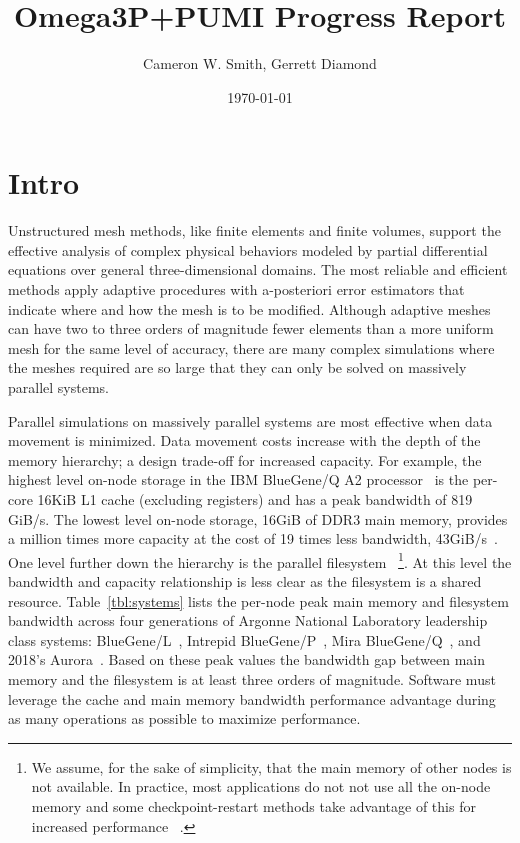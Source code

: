 \documentclass[a4paper]{article}
\title{Omega3P+PUMI Progress Report}
\author{Cameron W. Smith, Gerrett Diamond}
\date{\today}
\begin{document}
\maketitle
\section{Intro}

Unstructured mesh methods, like finite elements and finite volumes, support the 
effective analysis of complex physical behaviors modeled by partial differential
equations over general three-dimensional domains.
The most reliable and efficient methods apply adaptive procedures with
a-posteriori error estimators that indicate where and how the mesh is to be
modified.
Although adaptive meshes can have two to three orders of magnitude fewer
elements than a more uniform mesh for the same level of accuracy, there are many
complex simulations where the meshes required are so large that they can only be
solved on massively parallel systems.

Parallel simulations on massively parallel systems are most effective when data
movement is minimized.
Data movement costs increase with the depth of the memory hierarchy; a design
trade-off for increased capacity.
For example, the highest level on-node storage in the IBM BlueGene/Q A2
processor~\cite{haring2012ibm} is the per-core 16KiB L1 cache (excluding
registers) and has a peak bandwidth of 819 GiB/s.
The lowest level on-node storage, 16GiB of DDR3 main memory, provides a million
times more capacity at the cost of 19 times less bandwidth,
43GiB/s~\cite{lo2014roofline}.
One level further down the hierarchy is the parallel filesystem
~\footnote{We assume, for the sake of simplicity, that the main memory of other nodes is not
available.
In practice, most applications do not not use all the on-node memory and some
checkpoint-restart methods take advantage of this for increased performance
~\cite{rma-fault-tolerance-2014,isaila2014making,compression-cr-2012}.
}.
At this level the bandwidth and capacity relationship is less clear as the
filesystem is a shared resource.
Table~\ref{tbl:systems} lists the per-node peak main memory and filesystem
bandwidth across four generations of Argonne National Laboratory leadership
class systems: BlueGene/L~\cite{yu2006high,adiga2002overview}, Intrepid
BlueGene/P~\cite{lang2009performance,alam2008early}, Mira
BlueGene/Q~\cite{haring2012ibm,bui2014scalable}, and 2018's
Aurora~\cite{aurorafacts}.
Based on these peak values the bandwidth gap between main memory and the
filesystem is at least three orders of magnitude.
Software must leverage the cache and main memory bandwidth performance advantage
during as many operations as possible to maximize performance.
\end{document}
